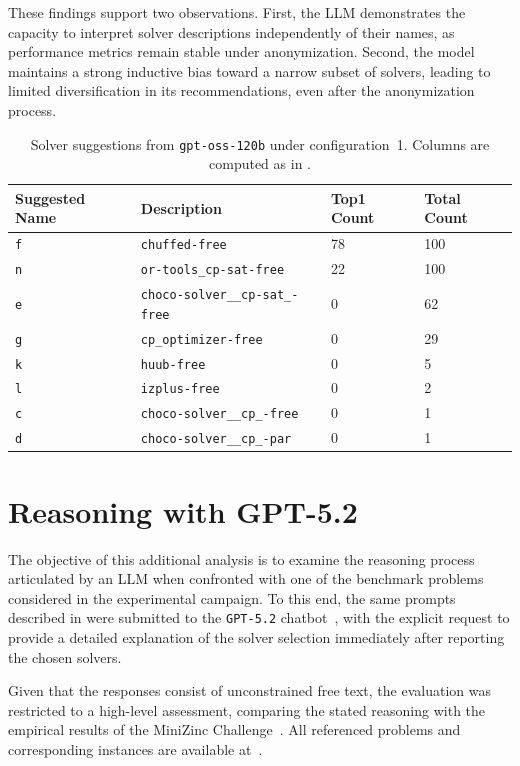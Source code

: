 \documentclass[../../main]{subfiles}
\begin{document}
These findings support two observations. First, the LLM demonstrates the capacity to interpret solver descriptions independently of their names, as performance metrics remain stable under anonymization. Second, the model maintains a strong inductive bias toward a narrow subset of solvers, leading to limited diversification in its recommendations, even after the anonymization process.

\begin{table}[ht]
    \centering
        \begin{tabular}{llll}
        \hline
            Suggested Name & Description & Top1 Count & Total Count \\ \hline
            \texttt{f} & \texttt{chuffed-free} & 78 & 100 \\ 
            \texttt{n} & \texttt{or-tools\_cp-sat-free} & 22 & 100 \\ 
            \texttt{e} & \texttt{choco-solver\_\_cp-sat\_-free} & 0 & 62 \\ 
            \texttt{g} & \texttt{cp\_optimizer-free} & 0 & 29 \\ 
            \texttt{k} & \texttt{huub-free} & 0 & 5 \\ 
            \texttt{l} & \texttt{izplus-free} & 0 & 2 \\ 
            \texttt{c} & \texttt{choco-solver\_\_cp\_-free} & 0 & 1 \\ 
            \texttt{d} & \texttt{choco-solver\_\_cp\_-par} & 0 & 1 \\ \hline
        \end{tabular}
    \caption{Solver suggestions from \texttt{gpt-oss-120b} under configuration~1. Columns are computed as in .}
    \label{tab:anonymousCount1}
\end{table}

\section{Reasoning with GPT-5.2}
The objective of this additional analysis is to examine the reasoning process articulated by an LLM when confronted with one of the benchmark problems considered in the experimental campaign. To this end, the same prompts described in  were submitted to the \texttt{GPT-5.2} chatbot~\cite{gpt52}, with the explicit request to provide a detailed explanation of the solver selection immediately after reporting the chosen solvers.

Given that the responses consist of unconstrained free text, the evaluation was restricted to a high-level assessment, comparing the stated reasoning with the empirical results of the MiniZinc Challenge~\cite{MznResults25}. All referenced problems and corresponding instances are available at~\cite{MznProblems}.
\end{document}
